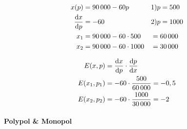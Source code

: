 \begin{alignat*}{2}
	x(p)                    & = 90\,000-60p\quad        &  & 1) p=500  \\
	\frac{\mathop{}\!\mathrm{d} x}{\mathop{}\!\mathrm{d} p} & = -60                     &  & 2) p=1000 \\
	x_1                     & = 90\,000 - 60 \cdot 500  &  & = 60\,000 \\
	x_2                     & = 90\,000 - 60 \cdot 1000 &  & = 30\,000
\end{alignat*}

\begin{align*}
	E(x, p)     & = \frac{\mathop{}\!\mathrm{d} x}{\mathop{}\!\mathrm{d} p} \cdot \frac{\mathop{}\!\mathrm{d} p}{\mathop{}\!\mathrm{d} x} \\
	E(x_1, p_1) & = -60 \cdot \frac{500}{60\,000} = -0,5                  \\
	E(x_2, p_2) & = -60 \cdot \frac{1000}{30\,000} = -2
\end{align*}

\paragraph{Polypol \& Monopol}

